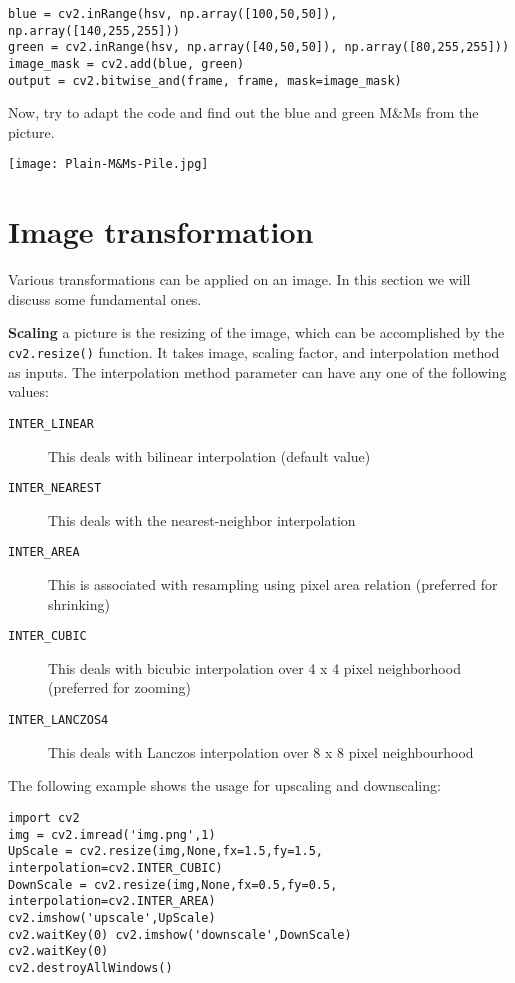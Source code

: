 \documentclass{labo}
\begin{document}
\begin{verbatim}
blue = cv2.inRange(hsv, np.array([100,50,50]), np.array([140,255,255]))
green = cv2.inRange(hsv, np.array([40,50,50]), np.array([80,255,255]))
image_mask = cv2.add(blue, green)
output = cv2.bitwise_and(frame, frame, mask=image_mask)
\end{verbatim}

\begin{leftbar}
Now, try to adapt the code and find out the {\color{blue}blue} and {\color{green}green} M\&Ms from the picture.
\end{leftbar}

\begin{center}
	\texttt{[image: Plain-M\&Ms-Pile.jpg]}
\end{center}

\section*{Image transformation}
Various transformations can be applied on an image. In this section we will discuss some fundamental ones.

\textbf{Scaling} a picture is the resizing of the image, which can be accomplished by the \texttt{cv2.resize()} function. It takes image, scaling factor, and interpolation method as inputs.
The interpolation method parameter can have any one of the following values:
\begin{description}
	\item[\texttt{INTER\_LINEAR}] This deals with bilinear interpolation (default value)
	\item[\texttt{INTER\_NEAREST}] This deals with the nearest-neighbor interpolation
	\item[\texttt{INTER\_AREA}] This is associated with resampling using pixel area relation (preferred for shrinking)
	\item[\texttt{INTER\_CUBIC}] This deals with bicubic interpolation over 4 x 4 pixel neighborhood (preferred for zooming)
	\item[\texttt{INTER\_LANCZOS4}] This deals with Lanczos interpolation over 8 x 8 pixel neighbourhood
\end{description}

The following example shows the usage for upscaling and downscaling:

\begin{verbatim}
import cv2
img = cv2.imread('img.png',1)
UpScale = cv2.resize(img,None,fx=1.5,fy=1.5, interpolation=cv2.INTER_CUBIC) 
DownScale = cv2.resize(img,None,fx=0.5,fy=0.5, interpolation=cv2.INTER_AREA) 
cv2.imshow('upscale',UpScale) 
cv2.waitKey(0) cv2.imshow('downscale',DownScale)
cv2.waitKey(0) 
cv2.destroyAllWindows()
\end{verbatim}
\end{document}
